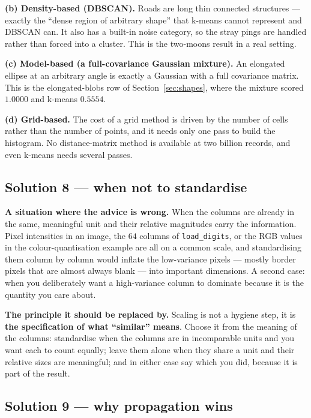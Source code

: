\documentclass[11pt]{article}
\begin{document}
\textbf{(b) Density-based (DBSCAN).} Roads are long thin connected structures
--- exactly the ``dense region of arbitrary shape'' that k-means cannot
represent and DBSCAN can. It also has a built-in noise category, so the stray
pings are handled rather than forced into a cluster. This is the two-moons
result in a real setting.

\textbf{(c) Model-based (a full-covariance Gaussian mixture).} An elongated
ellipse at an arbitrary angle is exactly a Gaussian with a full covariance
matrix. This is the elongated-blobs row of Section~\ref{sec:shapes}, where the
mixture scored $1.0000$ and k-means $0.5554$.

\textbf{(d) Grid-based.} The cost of a grid method is driven by the number of
cells rather than the number of points, and it needs only one pass to build
the histogram. No distance-matrix method is available at two billion records,
and even k-means needs several passes.

\subsection*{Solution 8 --- when not to standardise}

\textbf{A situation where the advice is wrong.} When the columns are already
in the same, meaningful unit and their relative magnitudes carry the
information. Pixel intensities in an image, the $64$ columns of
\texttt{load\_digits}, or the RGB values in the colour-quantisation example
are all on a common scale, and standardising them column by column would
inflate the low-variance pixels --- mostly border pixels that are almost
always blank --- into important dimensions. A second case: when you
deliberately want a high-variance column to dominate because it is the
quantity you care about.

\textbf{The principle it should be replaced by.} Scaling is not a hygiene
step, it is \textbf{the specification of what ``similar'' means}. Choose it
from the meaning of the columns: standardise when the columns are in
incomparable units and you want each to count equally; leave them alone when
they share a unit and their relative sizes are meaningful; and in either case
say which you did, because it is part of the result.

\subsection*{Solution 9 --- why propagation wins}
\end{document}

